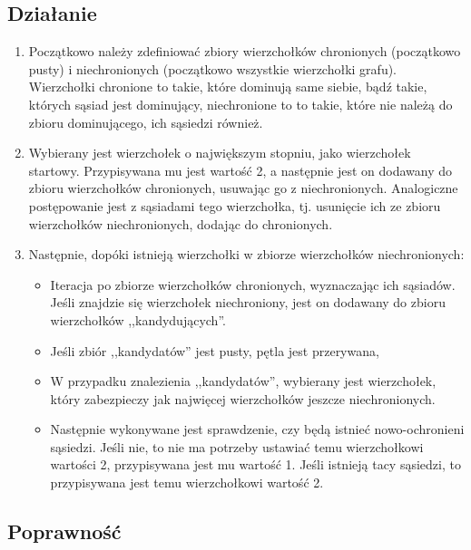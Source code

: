     \subsection{Działanie}
    
    \begin{enumerate}
        \item Początkowo należy zdefiniować zbiory wierzchołków chronionych (początkowo pusty) i niechronionych (początkowo wszystkie wierzchołki grafu). Wierzchołki chronione to takie, które dominują same siebie, bądź takie, których sąsiad jest dominujący, niechronione to to takie, które nie należą do zbioru dominującego, ich sąsiedzi również.
        \item Wybierany jest wierzchołek o największym stopniu, jako wierzchołek startowy. Przypisywana mu jest wartość 2, a następnie jest on dodawany do zbioru wierzchołków chronionych, usuwając go z niechronionych. Analogiczne postępowanie jest z sąsiadami tego wierzchołka, tj. usunięcie ich ze zbioru wierzchołków niechronionych, dodając do chronionych. 
        \item Następnie, dopóki istnieją wierzchołki w zbiorze wierzchołków niechronionych:
        \begin{itemize}
            \item Iteracja po zbiorze wierzchołków chronionych, wyznaczając ich sąsiadów. Jeśli znajdzie się wierzchołek niechroniony, jest on dodawany do zbioru wierzchołków ,,kandydujących''.
            \item Jeśli zbiór ,,kandydatów'' jest pusty, pętla jest przerywana,
            \item W przypadku znalezienia ,,kandydatów'', wybierany jest wierzchołek, który zabezpieczy jak najwięcej wierzchołków jeszcze niechronionych.
            \item Następnie wykonywane jest sprawdzenie, czy będą istnieć nowo-ochronieni sąsiedzi. Jeśli nie, to nie ma potrzeby ustawiać temu wierzchołkowi wartości 2, przypisywana jest mu wartość 1. Jeśli istnieją tacy sąsiedzi, to przypisywana jest temu wierzchołkowi wartość 2. 
        \end{itemize}
    \end{enumerate}

    \subsection{Poprawność}

